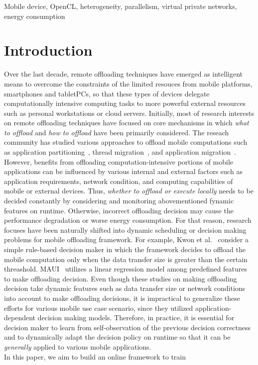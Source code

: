 \documentclass[10pt, conference, compsocconf]{IEEEtran}
\begin{document}
\begin{IEEEkeywords}
Mobile device, OpenCL, heterogeneity, parallelism, virtual private
networks, energy consumption
\end{IEEEkeywords}

\section{Introduction}
%
Over the last decade, remote offloading techniques have emerged as
intelligent means to overcome the constraints of the limited resouces
from mobile platforms, smartphones and tabletPCs, so that these types of
devices delegate computationally intensive computing tasks to more
powerful external resources such as personal workstations or cloud
servers.
%
Initially, most of research interests on remote offloading techniques
have focused on core mechanisms in which \textit{what to offload} and
\textit{how to offload} have been primarily considered. 
%
The reseach community has studied various approaches to offload mobile
computations such as application partitioning~\cite{spectra, maui,
cuckoo}, thread migration~\cite{clonecloud, comet}, and application
migration~\cite{hung}.\\
%
\indent However, benefits from offloading computation-intensive portions
of mobile applications can be influenced by various internal and
external factors such as application requirements, network condition,
and computing capabilities of mobile or external devices.
%
Thus, \textit{whether to offload or execute locally} needs to be
decided constantly by considering and monitoring abovementioned fynamic
features on runtime.
%
Otherwise, incorrect offloading decision may cause the performance
degradation or worse energy consumption.
%
For that reason, research focuses have been naturally shifted into
dynamic scheduling or decision making problems for mobile offloading
framework.
%
For example, Kwon et al.~\cite{kwon} consider a simple rule-based
decision maker in which the framework decides to offload the mobile
computation only when the data transfer size is greater than the certain
threashold.
%
MAUI~\cite{maui} utilizes a linear regression model among predefined
features to make offloading decision.
%
%
Even though these studies on making offloading decision take dynamic
features such as data transfer size or network conditions into account
to make offloading decisions, it is impractical to generalize these
efforts for various mobile use case scenario, since they utilized
application-dependent decision making models.
%
Therefore, in practice, it is essential for decision maker to learn
from self-observation of the previous decision correctness and to
dynamically adapt the decision policy on runtime so that it can be
\textit{generally} applied to various mobile applications.\\
%
\indent In this paper, we aim to build an online framework to train 
\end{document}
